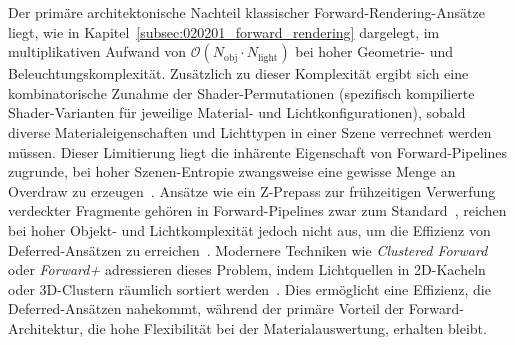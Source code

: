 Der primäre architektonische Nachteil klassischer Forward-Rendering-Ansätze liegt, wie in
Kapitel~\ref{subsec:020201_forward_rendering} dargelegt, im multiplikativen Aufwand von
$\mathcal{O}(N_{\text{obj}} \cdot N_{\text{light}})$ bei hoher
Geometrie- und Beleuchtungskomplexität.
Zusätzlich zu dieser Komplexität ergibt sich eine kombinatorische Zunahme der Shader-Permutationen (spezifisch
kompilierte Shader-Varianten für jeweilige Material- und Lichtkonfigurationen), sobald diverse Materialeigenschaften
und Lichttypen in einer Szene verrechnet werden müssen.
Dieser Limitierung liegt die inhärente Eigenschaft von Forward-Pipelines zugrunde, bei hoher Szenen-Entropie
zwangsweise eine gewisse Menge an Overdraw zu erzeugen~\parencite[vgl.][S.~1]{fatahalianReducingShadingGPUs2010}.
Ansätze wie ein Z-Prepass zur frühzeitigen Verwerfung verdeckter Fragmente gehören in Forward-Pipelines zwar zum
Standard~\parencite[vgl.][S.~57]{burnsVisibilityBufferCacheFriendly2013}, reichen bei hoher Objekt- und Lichtkomplexität
jedoch nicht aus, um die Effizienz von Deferred-Ansätzen zu
erreichen~\parencite[vgl.][S.~4]{Thaler2011DeferredRendering}.
Modernere Techniken wie \textit{Clustered Forward} oder \textit{Forward+} adressieren dieses Problem, indem
Lichtquellen in 2D-Kacheln oder 3D-Clustern räumlich sortiert
werden~\parencite[vgl.][]{olssonClusteredDeferredForward2012, haradaForwardBringingDeferred2012}.
Dies ermöglicht eine Effizienz, die Deferred-Ansätzen nahekommt, während der primäre Vorteil der Forward-Architektur,
die hohe Flexibilität bei der Materialauswertung, erhalten bleibt.

